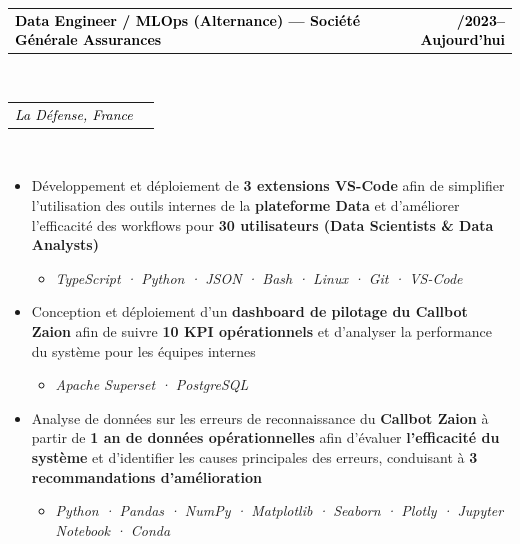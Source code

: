 \documentclass[10pt,english,french]{article}
\makeatletter
\newlength{\mpwidth}
\newcommand{\cvevent}[2]{
    \vspace{2pt}
    \parbox{\mpwidth}{
        \begin{tabular*}{1\mpwidth}{@{\extracolsep{\fill}} l r}
            \textcolor{black}{\textbf{\fontsize{11}{12}\selectfont #1}} & \textcolor{black}{\textbf{\fontsize{12}{12}\selectfont #2}} \\
        \end{tabular*}\\[-8pt] %
    }
}
\newcommand{\cvsubevent}[2]{
    \parbox{\mpwidth}{
        \begin{tabular*}{1\mpwidth}{@{\extracolsep{\fill}} l r}
            \textcolor{black}{\textit{\fontsize{10}{12}\selectfont #1}} & \textcolor{black}{\textit{\fontsize{10}{12}\selectfont #2}} \\
        \end{tabular*}\\[-8pt] %
    }
    \vspace{-10pt}
}
\makeatother
\begin{document}
\vspace{-4pt}
\cvevent{Data Engineer / MLOps (Alternance) --- Société Générale Assurances}{\fontsize{11pt}{11pt}\selectfont 09/2023\hspace{5pt}--\hspace{5pt}Aujourd'hui}
\cvsubevent{La Défense, France}{}

\vspace{-3pt}
\begin{itemize}[leftmargin=0.5cm, label=\textbullet, itemsep=0.0625em]
    \item Développement et déploiement de \textbf{3 extensions VS-Code} afin de
          simplifier l'utilisation des outils internes de la \textbf{plateforme Data} et
          d'améliorer l'efficacité des workflows pour \textbf{30\raisebox{0.20ex}{\small
                  +} utilisateurs (Data Scientists \& Data Analysts)}
          \begin{itemize}[leftmargin=0.25cm,label=\textendash,itemsep=0em,topsep=0.2em]
              \item \textit{\fontsize{10pt}{9pt}\selectfont TypeScript · Python · JSON · Bash · Linux · Git · VS-Code}
          \end{itemize}

    \item Conception et déploiement d'un \textbf{dashboard de pilotage du Callbot Zaion}
          afin de suivre \textbf{10\raisebox{0.20ex}{\small +} KPI opérationnels} et
          d'analyser la performance du système pour les équipes internes
          \begin{itemize}[leftmargin=0.25cm,label=\textendash,itemsep=0em,topsep=0.2em]
              \item \textit{\fontsize{10pt}{9pt}\selectfont Apache Superset · PostgreSQL}
          \end{itemize}

    \item Analyse de données sur les erreurs de reconnaissance du \textbf{Callbot Zaion}
          à partir de \textbf{1 an de données opérationnelles} afin d'évaluer
          \textbf{l'efficacité du système} et d'identifier les causes principales des
          erreurs, conduisant à \textbf{3 recommandations d'amélioration}
          \begin{itemize}[leftmargin=0.25cm,label=\textendash,itemsep=0em,topsep=0.2em]
              \item \textit{\fontsize{10pt}{9pt}\selectfont Python · Pandas · NumPy · Matplotlib · Seaborn · Plotly · Jupyter Notebook · Conda}
          \end{itemize}


\end{itemize}
\end{document}
